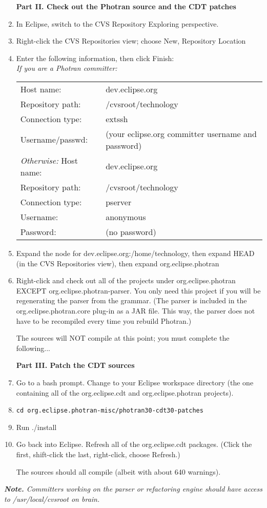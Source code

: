 \begin{enumerate}
\vspace{.5em}
\noindent\textbf{Part II.  Check out the Photran source and the CDT patches}

\item In Eclipse, switch to the CVS Repository Exploring perspective.
\item Right-click the CVS Repositories view; choose New, Repository Location
\item Enter the following information, then click Finish: \\
\textit{If you are a Photran committer:}
\begin{tabular}{ll}
        Host name:       & dev.eclipse.org \\
        Repository path: & /cvsroot/technology \\
        Connection type: & extssh \\
        Username/passwd: & (your eclipse.org committer username and password) \\
\textit{Otherwise:}
        Host name:       & dev.eclipse.org \\
        Repository path: & /cvsroot/technology \\
        Connection type: & pserver \\
        Username:        & anonymous \\
        Password:        & (no password) \\
\end{tabular}
\item Expand the node for dev.eclipse.org:/home/technology,
    then expand HEAD (in the CVS Repositories view), then expand
    org.eclipse.photran
\item{Right-click and check out all of the projects under org.eclipse.photran
    EXCEPT org.eclipse.photran-parser.
    You only need this project if you will be regenerating the parser from the
    grammar.  (The parser is included in the org.eclipse.photran.core plug-in
    as a JAR file.  This way, the parser does not have to be recompiled
    every time you rebuild Photran.)}

The sources will NOT compile at this point; you must complete the following...

\vspace{.5em}
\noindent\textbf{Part III.  Patch the CDT sources}

\item Go to a bash prompt.  Change to your Eclipse workspace directory
    (the one containing all of the org.eclipse.cdt and
    org.eclipse.photran projects).
\item \texttt{cd org.eclipse.photran-misc/photran30-cdt30-patches}
\item Run ./install
\item{Go back into Eclipse.  Refresh all of the org.eclipse.cdt packages.
    (Click the first, shift-click the last, right-click, choose Refresh.)}

The sources should all compile (albeit with about 640 warnings).

\end{enumerate}

\noindent\textit{\textbf{Note.} Committers working on the parser or refactoring
engine should have access to /usr/local/cvsroot on brain.}
